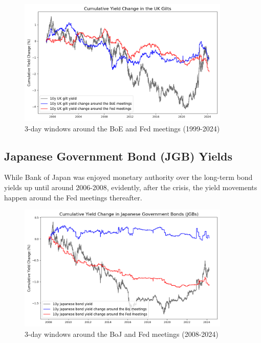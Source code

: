\begin{figure}[!htbp]
    \centering
    \includegraphics[width=0.9\textwidth]{figures/1999_uk_gilts_figure1a.png}
    \caption{3-day windows around the BoE and Fed meetings (1999-2024)}
    \label{fig:uk1999}
\end{figure}


\subsection{Japanese Government Bond (JGB) Yields}

While Bank of Japan was enjoyed monetary authority over the long-term bond yields up until around 2006-2008, evidently, after the crisis, the yield movements happen around the Fed meetings thereafter.

\begin{figure}[!htbp]
    \centering
    \includegraphics[width=0.9\textwidth]{figures/2008_japanese_bonds_figure1a.png}
    \caption{3-day windows around the BoJ and Fed meetings (2008-2024)}
    \label{fig:boj2008}
\end{figure}

